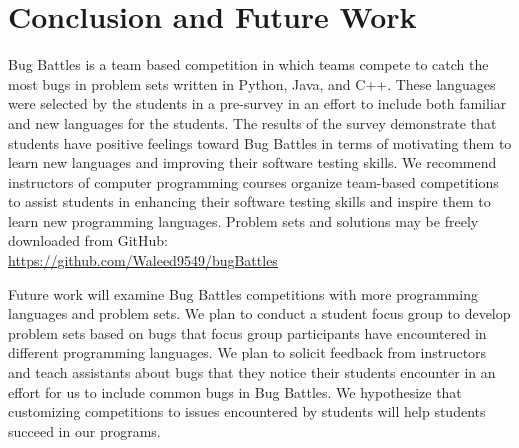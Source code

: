 \documentclass{article}
\begin{document}
\section{Conclusion and Future Work} \label{section:conclusions}
Bug Battles is a team based competition in which teams compete to catch the most bugs in problem sets written in Python, Java, and C++. These languages were selected by the students in a pre-survey in an effort to include both familiar and new languages for the students. The results of the survey demonstrate that students have positive feelings toward Bug Battles in terms of motivating them to learn new languages and improving their software testing skills. We recommend instructors of computer programming courses organize team-based competitions to assist students in enhancing their software testing skills and inspire them to learn new programming languages. Problem sets and solutions may be freely downloaded from GitHub:\\
\url{https://github.com/Waleed9549/bugBattles}

Future work will examine Bug Battles competitions with more programming languages and problem sets. We plan to conduct a student focus group to develop problem sets based on bugs that focus group participants have encountered in different programming languages. We plan to solicit feedback from instructors and teach assistants about bugs that they notice their students encounter in an effort for us to include common bugs in Bug Battles. We hypothesize that customizing competitions to issues encountered by students will help students succeed in our programs.



\medskip


\end{document}

